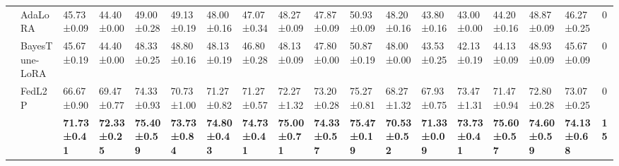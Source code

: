 \begin{table*}[t]
\begin{scriptsize}
{\begin{tabular}{c|l|l|l|l|l|l|l|l|l|l|l|l|l|l|l|l|c}
                    & AdaLoRA                              & 45.73±0.09                       & 44.40±0.00                        & 49.00±0.28                        & 49.13±0.19                       & 48.00±0.16                        & 47.07±0.34                       & 48.27±0.09                       & 47.87±0.09                       & 50.93±0.09                       & 48.20±0.16                        & 43.80±0.16                        & 43.00±0.00                        & 44.20±0.16                        & 48.87±0.09                       & 46.27±0.25                       & 0             \\ %
                    & BayesTune-LoRA                            & 45.67±0.19                       & 44.40±0.00                        & 48.33±0.25                       & 48.80±0.16                        & 48.13±0.19                       & 46.80±0.28                        & 48.13±0.09                       & 47.80±0.00                        & 50.87±0.19                       & 48.00±0.00                        & 43.53±0.25                       & 42.13±0.19                       & 44.13±0.09                       & 48.93±0.09                       & 45.67±0.09                       & 0             \\ %
                    & FedL2P                               & 66.67±0.90                       & 69.47±0.77                       & 74.33±0.93                       & 70.73±1.00                        & 71.27±0.82                       & 71.27±0.57                       & 72.27±1.32                       & 73.20±0.28                        & 75.27±0.81                       & 68.27±1.32                       & 67.93±0.75                       & 73.47±1.31                       & 71.47±0.94                       & 72.80±0.28                        & 73.07±0.25                       & 0             \\ %
                    & \method{}                                 & \textbf{71.73±0.41}              & \textbf{72.33±0.25}              & \textbf{75.40±0.59}               & \textbf{73.73±0.84}              & \textbf{74.80±0.43}               & \textbf{74.73±0.41}              & \textbf{75.00±0.71}               & \textbf{74.33±0.57}              & \textbf{75.47±0.19}              & \textbf{70.53±0.52}              & \textbf{71.33±0.09}              & \textbf{73.73±0.41}              & \textbf{75.60±0.57}               & \textbf{74.60±0.59}               & \textbf{74.13±0.68}              & \textbf{15}   \\ \hline

\end{tabular}}
\end{scriptsize}
\end{table*}
